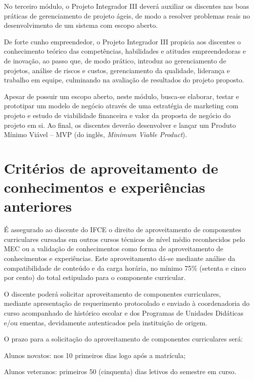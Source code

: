 \documentclass[
	12pt,				%
	openright,			%
	twoside,			%
	a4paper,			%
	chapter=TITLE,		%
	english,			%
	french,				%
	spanish,			%
	brazil,				%
	]{abntex2}
\begin{document}
\begin{alineas}
No terceiro módulo, o Projeto Integrador III deverá auxiliar os discentes nas boas práticas de gerenciamento de projeto ágeis, de modo a resolver problemas reais no desenvolvimento de um sistema com escopo aberto.

De forte cunho empreendedor, o Projeto Integrador III propicia aos discentes o conhecimento teórico das competências, habilidades e atitudes empreendedoras e de inovação, ao passo que, de modo prático, introduz ao gerenciamento de projetos, análise de riscos e custos, gerenciamento da qualidade, liderança e trabalho em equipe, culminando na avaliação de resultados do projeto proposto.

Apesar de possuir um escopo aberto, neste módulo, busca-se elaborar, testar e prototipar um modelo de negócio através de uma estratégia de marketing com projeto e estudo de viabilidade financeira e valor da proposta de negócio do projeto em si. Ao final, os discentes deverão desenvolver e lançar um Produto Mínimo Viável -- MVP (do inglês, \textit{Minimum Viable Product}).

\end{alineas}



\chapter{Critérios de aproveitamento de conhecimentos e experiências anteriores}


É assegurado ao discente do IFCE o direito de aproveitamento de componentes curriculares cursadas em outros cursos técnicos de nível médio reconhecidos pelo MEC ou a validação de conhecimentos como forma de aproveitamento de conhecimentos e experiências. Este aproveitamento dá-se mediante análise da compatibilidade de conteúdo e da carga horária, no mínimo 75\% (setenta e cinco por cento) do total estipulado para o componente curricular.

O discente poderá solicitar aproveitamento de componentes curriculares, mediante apresentação de requerimento protocolado e enviado à coordenadoria do curso acompanhado de histórico escolar e dos Programas de Unidades Didáticas e/ou ementas, devidamente autenticados pela instituição de origem.

O prazo para a solicitação do aproveitamento de componentes curriculares será:
\begin{alineas}
\item Alunos novatos: nos 10 primeiros dias logo após a matrícula;
\item  Alunos veteranos: primeiros 50 (cinquenta) dias letivos do semestre em curso.
\end{alineas} 
\end{document}
